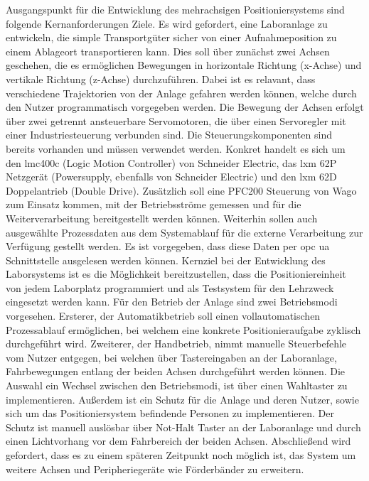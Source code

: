\documentclass[../../../Bachelorarbeit.tex]{subfiles}
\begin{document}
Ausgangspunkt für die Entwicklung des mehrachsigen Positioniersystems sind folgende Kernanforderungen \bzw Ziele. Es wird gefordert, eine Laboranlage zu entwickeln, die simple Transportgüter sicher von einer Aufnahmeposition zu einem Ablageort transportieren kann. Dies soll über zunächst zwei Achsen geschehen, die es ermöglichen Bewegungen in horizontale Richtung (x-Achse) und vertikale Richtung (z-Achse) durchzuführen. Dabei ist es relavant, dass verschiedene Trajektorien von der Anlage gefahren werden können, welche durch den Nutzer programmatisch vorgegeben werden. Die Bewegung der Achsen erfolgt über zwei getrennt ansteuerbare Servomotoren, die über einen Servoregler mit einer Industriesteuerung verbunden sind. Die Steuerungskomponenten sind bereits vorhanden und müssen verwendet werden. Konkret handelt es sich um den \acs{lmc}400c (Logic Motion Controller) von Schneider Electric, das \acs{lxm} 62P Netzgerät (\eng Powersupply, ebenfalls von Schneider Electric) und den \acs{lxm} 62D Doppelantrieb (\eng Double Drive). Zusätzlich soll eine PFC200 Steuerung von Wago zum Einsatz kommen, mit der Betriebsströme gemessen und für die Weiterverarbeitung bereitgestellt werden können. Weiterhin sollen auch ausgewählte Prozessdaten aus dem Systemablauf für die externe Verarbeitung zur Verfügung gestellt werden. Es ist vorgegeben, dass diese Daten per \ac{opc} \ac{ua} Schnittstelle ausgelesen werden können. Kernziel bei der Entwicklung des Laborsystems ist es die Möglichkeit bereitzustellen, dass die Positioniereinheit von jedem Laborplatz programmiert und als Testsystem für den Lehrzweck eingesetzt werden kann. Für den Betrieb der Anlage sind zwei Betriebsmodi vorgesehen. Ersterer, der Automatikbetrieb soll einen vollautomatischen Prozessablauf ermöglichen, bei welchem eine konkrete Positionieraufgabe zyklisch durchgeführt wird. Zweiterer, der Handbetrieb, nimmt manuelle Steuerbefehle vom Nutzer entgegen, bei welchen über Tastereingaben an der Laboranlage, Fahrbewegungen entlang der beiden Achsen durchgeführt werden können. Die Auswahl \bzw ein Wechsel zwischen den Betriebsmodi, ist über einen Wahltaster zu implementieren. Außerdem ist ein Schutz für die Anlage und deren Nutzer, sowie sich um das Positioniersystem befindende Personen zu implementieren. Der Schutz ist manuell auslösbar über Not-Halt Taster an der Laboranlage und durch einen Lichtvorhang vor dem Fahrbereich der beiden Achsen. Abschließend wird gefordert, dass es zu einem späteren Zeitpunkt noch möglich ist, das System um weitere Achsen und Peripheriegeräte wie \bspw Förderbänder zu erweitern.
\end{document}
